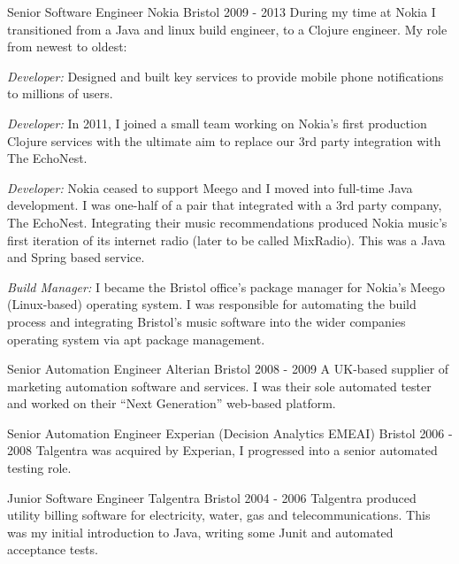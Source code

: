 \begin{cventries}
    \cventrypara
    {Senior Software Engineer} %
    {Nokia} %
    {Bristol} %
    {2009 - 2013} %
    {During my time at Nokia I transitioned from a Java and linux build engineer, to a Clojure engineer. My role from
    newest to oldest:}
    {
        \begin{cvitems} %
            \item {\emph{Developer:} Designed and built key services to provide mobile phone notifications to
            millions of users.}
            \item {\emph{Developer:} In 2011, I joined a small team working on Nokia's first production Clojure
            services with the ultimate aim to replace our 3rd party integration with The EchoNest.}
            \item {\emph{Developer:} Nokia ceased to support Meego and I moved into full-time Java development. I was
            one-half of a pair that integrated with a 3rd party company, The EchoNest.
            Integrating their music recommendations produced Nokia music’s first iteration of its internet radio
                (later to be called MixRadio). This was a Java and Spring based service.}
            \item {\emph{Build Manager:} I became the Bristol office's package manager for Nokia's Meego
                (Linux-based) operating system.
                I was responsible for automating the build process and integrating Bristol's music software into the
                wider companies operating system via apt package management.}
        \end{cvitems}
    }

    \cventry
    {Senior Automation Engineer} %
    {Alterian} %
    {Bristol} %
    {2008 - 2009} %
    {A UK-based supplier of marketing automation software and services. I was their sole automated tester and worked on
    their “Next Generation” web-based platform.}

    \cventry
    {Senior Automation Engineer} %
    {Experian (Decision Analytics EMEAI)} %
    {Bristol} %
    {2006 - 2008} %
    {Talgentra was acquired by Experian, I progressed into a senior automated testing role.}

    \cventry
    {Junior Software Engineer} %
    {Talgentra} %
    {Bristol} %
    {2004 - 2006} %
    {Talgentra produced utility billing software for electricity, water, gas and telecommunications. This was my
    initial introduction to Java, writing some Junit and automated acceptance tests.
    }
\end{cventries}
